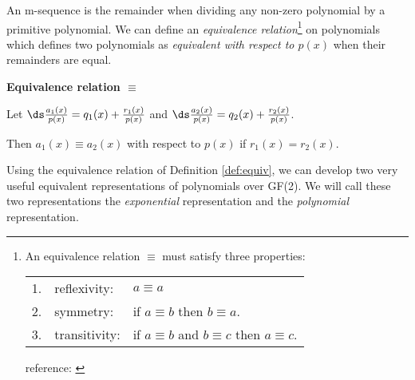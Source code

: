 An m-sequence is the remainder when dividing any non-zero polynomial by a primitive 
polynomial.  
We can define an {\em equivalence relation}\footnote{
   An equivalence relation $\equiv$ must satisfy three properties:

\begin{tabular}{cll}
   1. & reflexivity:   & $a\equiv a$ \\
   2. & symmetry:      & if $a\equiv b$ then $b\equiv a$. \\
   3. & transitivity:  & if $a\equiv b$ and  $b\equiv c$ then $a\equiv c$. 
\end{tabular}

reference: \cite[p.7]{ab}
}
on polynomials which defines two polynomials as
{\em equivalent with respect to $p(x)$}
when their remainders are equal.

\begin{definition} {\bf Equivalence relation $\equiv$} \\
\label{def:equiv}

\begin{center}
Let  \hspace{5mm}
   $\ds \frac{a_1(x)}{p(x)} = q_1(x) + \frac{r_1(x)}{p(x)}$
\hspace{5mm} and \hspace{5mm}
   $\ds \frac{a_2(x)}{p(x)} = q_2(x) + \frac{r_2(x)}{p(x)}$.
\end{center}

Then $a_1(x)\equiv a_2(x)$ with respect to $p(x)$ if $r_1(x)=r_2(x)$. 
\end{definition}

Using the equivalence relation of Definition \ref{def:equiv},
we can develop two very useful equivalent representations of
polynomials over GF(2).  
We will call these two representations the {\em exponential} representation
and the {\em polynomial} representation.

